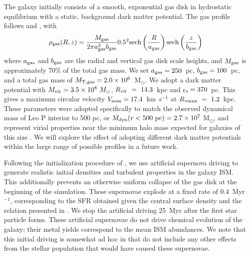 \documentclass[twocolumn]{aastex61}
\begin{document}
The galaxy initially consists of a smooth, exponential gas disk in hydrostatic equilibrium with a static, background dark matter potential. The gas profile follows \citet{Tonnesen2009} and \citet{Salem2015}, with
\begin{equation}
\rho_{\rm gas} (R,z) = \frac{M_{\rm gas}}{2\pi a^2_{\rm gas}b_{\rm gas}} 0.5^2{\rm sech}\left(\frac{R}{a_{\rm gas}}\right){\rm sech}\left(\frac{z}{b_{\rm gas}}\right)
\end{equation}
where $a_{\rm gas}$ and $b_{\rm gas}$ are the radial and vertical gas disk scale heights, and $M_{\rm gas}$ is approximately 70\% of the total gas mass. We set $a_{\rm gas} = 250$~pc, $b_{\rm gas} = 100$~pc, and a total gas mass of $M_{\rm T,gas} = 2.0\times 10^6$~M$_{\odot}$. We adopt a \citet{Burkert1995} dark matter potential with $M_{\rm vir} = 3.5\times 10^{8}~M_{\odot}$, $R_{\rm vir}~=~14.3$~kpc and r$_{\rm s} = 370$~pc. This gives a maximum circular velocity $V_{\rm max} = 17.4$~km~s$^{-1}$ at $R_{\rm vmax}~=~1.2$~kpc. These parameters were adopted specifically to match the observed dynamical mass of Leo P interior to 500 pc, or $M_{\rm dyn} (r < 500~\rm{pc}) = 2.7\times 10^{7}$ M$_{\odot}$, and represent virial properties near the minimum halo mass expected for galaxies of this size \citep{Ferrero2012}. We will explore the effect of adopting different dark matter potentials within the large range of possible profiles in a future work.

Following the initialization procedure of \citet{Hu2017}, we use artificial supernova driving to generate realistic initial densities and turbulent properties in the galaxy ISM. This additionally prevents an otherwise uniform collapse of the gas disk at the beginning of the simulation. These supernovae explode at a fixed rate of $0.4$~Myr$^{-1}$, corresponding to the SFR obtained given the central  surface density and the relation presented in \citep{Roychowdhury2009}. We stop the artificial driving 25~Myr after the first star particle forms. These artificial supernovae do not drive chemical evolution of the galaxy; their metal yields correspond to the mean ISM abundances. We note that this initial driving is somewhat ad hoc in that do not include any other effects from the stellar population that would have caused these supernovae.
\end{document}
